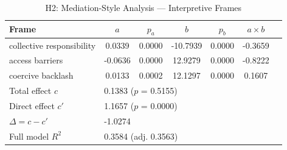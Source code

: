 \begin{table}[ht]
\centering
\caption{H2: Mediation-Style Analysis — Interpretive Frames}
\label{tab:h2-mediation}
\begin{tabular}{lcccccc}
\toprule
Frame & $a$ & $p_a$ & $b$ & $p_b$ & $a \times b$ \\
\midrule
collective responsibility & 0.0339 & 0.0000 & -10.7939 & 0.0000 & -0.3659 \\
access barriers & -0.0636 & 0.0000 & 12.9279 & 0.0000 & -0.8222 \\
coercive backlash & 0.0133 & 0.0002 & 12.1297 & 0.0000 & 0.1607 \\
\midrule
Total effect $c$ & \multicolumn{5}{l}{ 0.1383 ($p$ = 0.5155) } \\
Direct effect $c'$ & \multicolumn{5}{l}{ 1.1657 ($p$ = 0.0000) } \\
$\Delta = c - c'$ & \multicolumn{5}{l}{ -1.0274 } \\
Full model $R^2$ & \multicolumn{5}{l}{ 0.3584 (adj. 0.3563) } \\
\bottomrule
\end{tabular}
\end{table}
